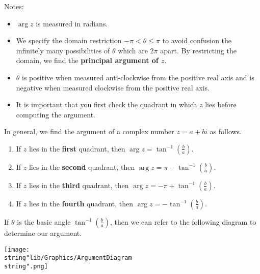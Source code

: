 \documentclass[11pt,a4paper]{book}
\begin{document}
Notes:

\begin{itemize}

\item  $\arg z$ is measured in radians.

\item  We specify the domain restriction $-\pi<\theta\leq\pi$ to
avoid confusion the infinitely many possibilities of $\theta$ which
are $2\pi$ apart. By restricting the domain, we find the \textbf{principal
argument of $z$}.

\item  $\theta$ is positive when measured anti-clockwise from the
positive real axis and is negative when measured clockwise from the
positive real axis.

\item  It is important that you first check the quadrant in which
$z$ lies before computing the argument.

\end{itemize}

In general, we find the argument of a complex number $z=a+bi$ as
follows.

\begin{enumerate}

\item  If $z$ lies in the \textbf{first} quadrant, then ${\displaystyle \arg z=\tan^{-1}\left(\frac{b}{a}\right)}$.

\item  If $z$ lies in the \textbf{second} quadrant, then ${\displaystyle \arg z=\pi-\tan^{-1}\left(\frac{b}{a}\right)}$.

\item  If $z$ lies in the \textbf{third} quadrant, then ${\displaystyle \arg z=-\pi+\tan^{-1}\left(\frac{b}{a}\right)}$.

\item  If $z$ lies in the \textbf{fourth} quadrant, then ${\displaystyle \arg z=-\tan^{-1}\left(\frac{b}{a}\right)}$.

\end{enumerate}

If $\theta$ is the basic angle ${\displaystyle \tan^{-1}\left(\frac{b}{a}\right)}$,
then we can refer to the following diagram to determine our argument.
\begin{center}
\texttt{[image: \\string"lib/Graphics/ArgumentDiagram\\string".png]}
\par\end{center}
\end{document}
